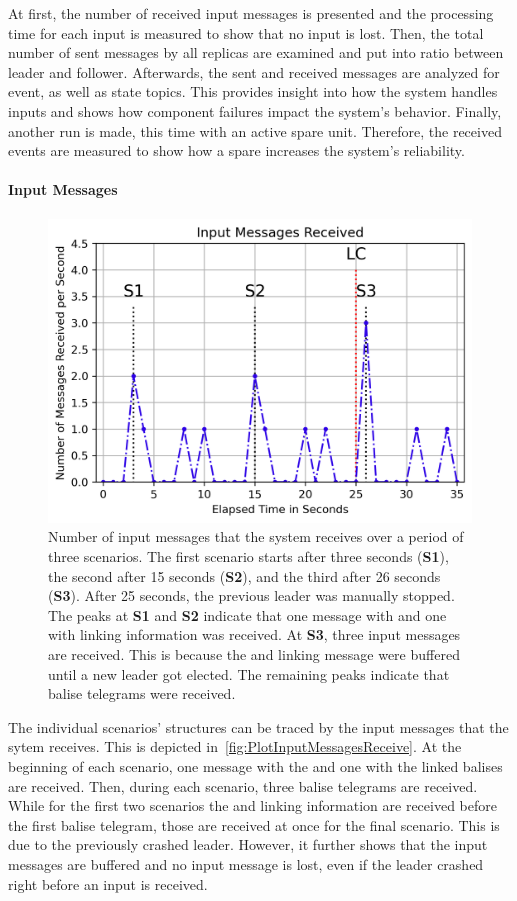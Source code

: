 At first, the number of received input messages is presented and the processing time for each input is measured to show that no input is lost.
Then, the total number of sent messages by all replicas are examined and put into ratio between leader and follower.
Afterwards, the sent and received messages are analyzed for event, as well as state topics.
This provides insight into how the system handles inputs and shows how component failures impact the system's behavior.
Finally, another run is made, this time with an active spare unit.
Therefore, the received events are measured to show how a spare increases the system's reliability.

\paragraph{Input Messages}

\begin{figure}[!hb]
	\centering
	\includegraphics[width=0.8\linewidth]{images/plots/InputMessagesReceive}
	\caption{Number of input messages that the system receives over a period of three scenarios. The first scenario starts after three seconds (\textbf{S1}), the second after 15 seconds (\textbf{S2}), and the third after 26 seconds (\textbf{S3}). After 25 seconds, the previous leader was manually stopped. The peaks at \textbf{S1} and \textbf{S2} indicate that one message with  and one with linking information was received. At \textbf{S3}, three input messages are received. This is because the  and linking message were buffered until a new leader got elected. The remaining peaks indicate that balise telegrams were received.}
	\label{fig:PlotInputMessagesReceive}
\end{figure}

The individual scenarios' structures can be traced by the input messages that the sytem receives.
This is depicted in~\autoref{fig:PlotInputMessagesReceive}.
At the beginning of each scenario, one message with the  and one with the linked balises are received.
Then, during each scenario, three balise telegrams are received.
While for the first two scenarios the  and linking information are received before the first balise telegram, those are received at once for the final scenario.
This is due to the previously crashed leader.
However, it further shows that the input messages are buffered and no input message is lost, even if the leader crashed right before an input is received.

